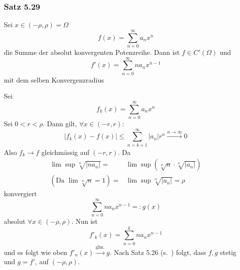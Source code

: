 \subsubsection*{Satz 5.29}
Sei $x\in\left( -\rho,\rho\right)=\Omega$ \[f\left( x \right) = \sum\limits_{n = 0}^\infty  {{a_n}{x^n}}\] die Summe der absolut konvergenten Potenzreihe. Dann ist $f\in C'\left( \Omega\right)$ und
\[f'\left( x \right) = \sum\limits_{n = 0}^\infty  {n{a_n}{x^{n - 1}}} \]
mit dem selben Konvergenzradius

\begin{beweis}{}
Sei
\[{f_k}\left( x \right) = \sum\limits_{n = 0}^\infty  {{a_n}{x^n}} \]
Sei $0<r<\rho$. Dann gilt, $\forall x\in\left( -r,r\right)$:
\[\left| {{f_k}\left( x \right) - f\left( x \right)} \right| \le \sum\limits_{n = k + 1}^\infty  {\left| {{a_n}} \right|{r^n}} \mathop  \to \limits^{n \to \infty } 0\]
Also $f_k\to f$ gleichmässig auf $\left( -r,r\right)$. Da
\begin{align*}
\lim \sup \sqrt[n]{{\left| {n{a_n}} \right|}} = &\lim \sup \left( {\sqrt[n]{n} \cdot \sqrt[n]{{\left| {{a_n}} \right|}}} \right)\\
\left( {{\text{Da }}\lim \sqrt[n]{n} = 1} \right) = &\lim \sup \sqrt[n]{{\left| {{a_n}} \right|}} = \rho
\end{align*}
 konvergiert
\[\sum\limits_{n = 0}^\infty  {n{a_n}{x^{n - 1}}}  = :g\left( x \right)\]
absolut $\forall x\in\left( -\rho,\rho\right)$. Nun ist
\[f{'_k}\left( x \right) = \sum\limits_{n = 0}^k {n{a_n}{x^{n - 1}}} \]
und es folgt wie oben $f{'_n}\left( x \right)\mathop  \to \limits^{{\text{glm.}}} g$. Nach Satz 5.26 (s.~\pageref{satz5.26}) folgt, dass $f,g$ stetig und $g=f'$, auf $\left( -\rho,\rho\right)$.
\end{beweis}

